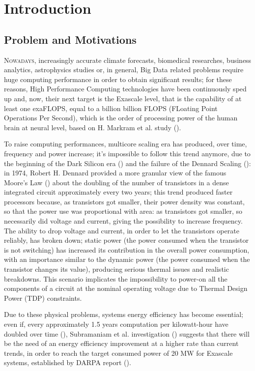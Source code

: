 \chapter{Introduction}

\section{Problem and Motivations}

\lettrine{N}{owadays}, increasingly accurate climate forecasts, biomedical researches, business analytics, astrophysics studies or, in general, Big Data related problems require huge computing performance in order to obtain significant results; for these reasons, High Performance Computing technologies have been continuously sped up and, now, their next target is the Exascale level, that is the capability of at least one exaFLOPS, equal to a billion billion FLOPS (FLoating Point Operations Per Second), which is the order of processing power of the human brain at neural level, based on H. Markram et al. study (\cite{markram2011introducing}).

To raise computing performances, multicore scaling era has produced, over time, frequency and power increase; it's impossible to follow this trend anymore, due to the beginning of the Dark Silicon era (\cite{esmaeilzadeh2011dark}) and the failure of the Dennard Scaling (\cite{dennard1974design}): in 1974, Robert H. Dennard provided a more granular view of the famous Moore's Law (\cite{moore1998cramming}) about the doubling of the number of transistors in a dense integrated circuit approximately every two years; this trend produced faster processors because, as transistors got smaller, their power density was constant, so that the power use was proportional with area: as transistors got smaller, so necessarily did voltage and current, giving the possibility to increase frequency. The ability to drop voltage and current, in order to let the transistors operate reliably, has broken down; static power (the power consumed when the transistor is not switching) has increased its contribution in the overall power consumption, with an importance similar to the dynamic power (the power consumed when the transistor changes its value), producing serious thermal issues and realistic breakdowns. This scenario implicates the impossibility to power-on all the components of a circuit at the nominal operating voltage due to Thermal Design Power (TDP) constraints.

Due to these physical problems, systems energy efficiency has become essential; even if, every approximately 1.5 years computation per kilowatt-hour have doubled over time (\cite{koomey2011implications}), Subramaniam et al. investigation (\cite{subramaniam2013trends}) suggests that there will be the need of an energy efficiency improvement at a higher rate than current trends, in order to reach the target consumed power of 20 MW for Exascale systems, established by DARPA report (\cite{bergman2008exascale}).

